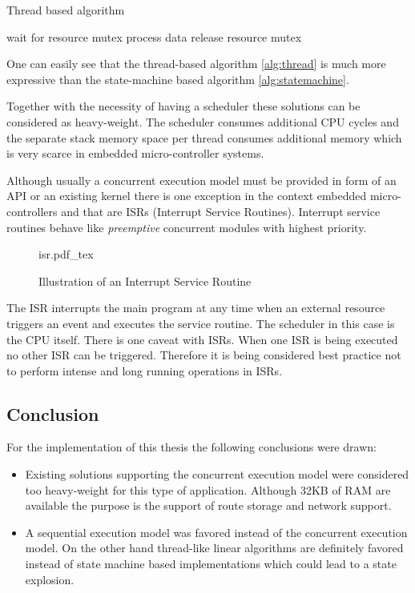 \begin{algorithm}[H]
\caption{Thread based algorithm}
\label{alg:thread}
\begin{algorithmic}
    \STATE wait for resource mutex
    \STATE process data
    \STATE release resource mutex
\ENDWHILE
\end{algorithmic}
\end{algorithm}

One can easily see that the thread-based algorithm \ref{alg:thread} is much more expressive than the state-machine based algorithm \ref{alg:statemachine}.

Together with the necessity of having a scheduler these solutions can be considered as heavy-weight. The scheduler consumes additional CPU cycles and the separate stack memory space per thread consumes additional memory which is very scarce in embedded micro-controller systems.

Although usually a concurrent execution model must be provided in form of an API or an existing kernel there is one exception in the context embedded micro-controllers and that are ISRs (Interrupt Service Routines). Interrupt service routines behave like \emph{preemptive} concurrent modules with highest priority.

\begin{figure}[H]
\centering
{isr.pdf_tex}
\caption{Illustration of an Interrupt Service Routine}
\end{figure}

The ISR interrupts the main program at any time when an external resource triggers an event and executes the service routine. The scheduler in this case is the CPU itself. There is one caveat with ISRs. When one ISR is being executed no other ISR can be triggered. Therefore it is being considered best practice not to perform intense and long running operations in ISRs.

\subsection{Conclusion}%
For the implementation of this thesis the following conclusions were drawn:

\begin{itemize}
    \item Existing solutions supporting the concurrent execution model were considered too heavy-weight for this type of application. Although 32KB of RAM are available the purpose is the support of route storage and network support.
    \item A sequential execution model was favored instead of the concurrent execution model. On the other hand thread-like linear algorithms are definitely favored instead of state machine based implementations which could lead to a state explosion.
\end{itemize}

